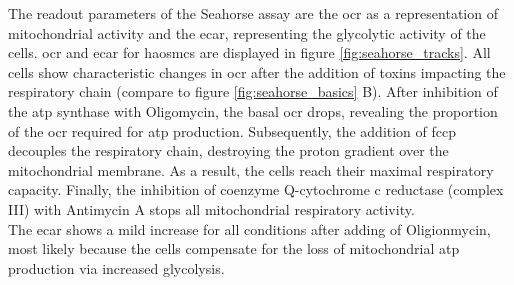    The readout parameters of the Seahorse assay are the \ac{ocr} as a representation of mitochondrial activity and the \ac{ecar}, representing the glycolytic activity of the cells. \ac{ocr} and \ac{ecar} for \acp{haosmc} are displayed in figure \ref{fig:seahorse_tracks}. All cells show characteristic changes in \ac{ocr} after the addition of toxins impacting the respiratory chain (compare to figure \ref{fig:seahorse_basics} B). After inhibition of the \ac{atp} synthase with Oligomycin, the basal \ac{ocr} drops, revealing the proportion of the \ac{ocr} required for \ac{atp} production. Subsequently, the addition of \ac{fccp} decouples the respiratory chain, destroying the proton gradient over the mitochondrial membrane. As a result, the cells reach their maximal respiratory capacity. Finally, the inhibition of coenzyme Q-cytochrome c reductase (complex III) with Antimycin A stops all mitochondrial respiratory activity.\\
    The \ac{ecar} shows a mild increase for all conditions after adding of Oligionmycin, most likely because the cells compensate for the loss of mitochondrial \ac{atp} production via increased glycolysis.

